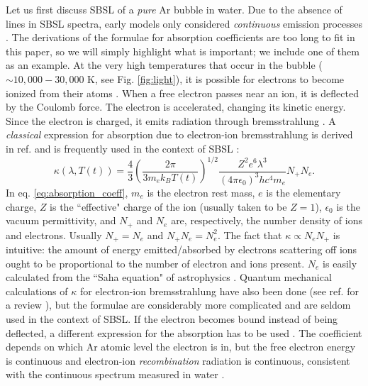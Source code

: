 \documentclass[11pt,prb,aps,nofootinbib,superscriptaddress,floatfix]{revtex4-2}
\begin{document}
Let us first discuss SBSL of a \emph{pure} Ar bubble in water. Due to the absence of lines in SBSL spectra, early models only considered \emph{continuous} emission processes \cite{hilgenfeldt1999simple,hilgenfeldt1999sonoluminescence}. The derivations of the formulae for absorption coefficients are too long to fit in this paper, so we will simply highlight what is important; we include one of them as an example. At the very high temperatures that occur in the bubble ($\sim10,000-30,000$ K, see Fig. \ref{fig:light}), it is possible for electrons to become ionized from their atoms \cite{zel2002physics}. When a free electron passes near an ion, it is deflected by the Coulomb force. The electron is accelerated, changing its kinetic energy. Since the electron is charged, it emits radiation through bremsstrahlung \cite{jackson1999classical,griffiths2005introduction,zel2002physics}. A \emph{classical} expression for absorption due to electron-ion bremsstrahlung is derived in ref. \cite{zel2002physics} and is frequently used in the context of SBSL \cite{hilgenfeldt1999simple,hilgenfeldt1999sonoluminescence,an2006mechanism,an2008spectral,an2009diagnosing}:
\begin{equation}
    \kappa(\lambda,T(t)) = \frac{4}{3} \left( \frac{2\pi}{3 m_e k_B T(t)} \right)^{1/2} \frac{Z^2 e^6 \lambda^3}{ (4 \pi \epsilon_0)^3 h c^4 m_e } N_+ N_e .
    \label{eq:absorption_coeff}
\end{equation}
In eq. \ref{eq:absorption_coeff}, $m_e$ is the electron rest mass, $e$ is the elementary charge, $Z$ is the ``effective" charge of the ion (usually taken to be $Z=1$), $\epsilon_0$ is the vacuum permittivity, and $N_+$ and $N_e$ are, respectively, the number density of ions and electrons. Usually $N_+=N_e$ and $N_+N_e=N_e^2$. The fact that $\kappa \propto N_e N_+$ is intuitive: the amount of energy emitted/absorbed by electrons scattering off ions ought to be proportional to the number of electron and ions present. $N_e$ is easily calculated from the ``Saha equation" of astrophysics \cite{hilgenfeldt1999simple,an2006mechanism,zel2002physics}. Quantum mechanical calculations of $\kappa$ for electron-ion bremsstrahlung have also been done (see ref. for a review \cite{eckert2015aether}), but the formulae are considerably more complicated and are seldom used in the context of SBSL. If the electron becomes bound instead of being deflected, a different expression for the absorption has to be used \cite{zel2002physics}. The coefficient depends on which Ar atomic level the electron is in, but the free electron energy is continuous and electron-ion \emph{recombination} radiation is continuous, consistent with the continuous spectrum measured in water \cite{hilgenfeldt1999simple,hilgenfeldt1999sonoluminescence}. 
\end{document}
